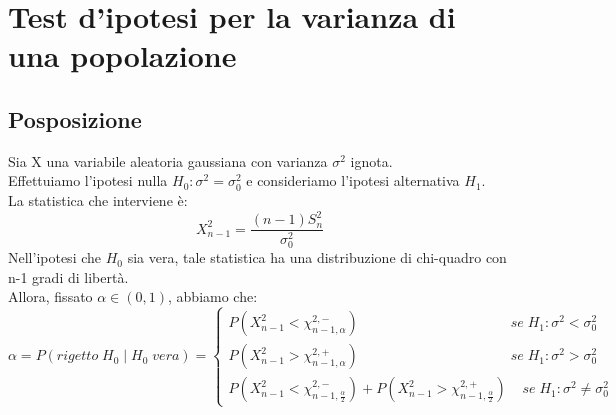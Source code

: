\documentclass{article}
\begin{document}
\section*{Test d'ipotesi per la varianza di una popolazione}
\subsection*{Posposizione}
Sia X una variabile aleatoria gaussiana con varianza $\sigma^{2}$ ignota.\\
Effettuiamo l'ipotesi nulla $H_{0}: \sigma^{2} = \sigma^{2}_{0}$ e consideriamo l'ipotesi alternativa $H_{1}$.\\
La statistica che interviene è:
\[ X_{n-1}^{2} = \frac{(n-1)S_{n}^{2}}{\sigma_{0}^{2}} \]
Nell'ipotesi che $H_{0}$ sia vera, tale statistica ha una distribuzione di chi-quadro con n-1 gradi di libertà.\\
Allora, fissato $\alpha \in (0,1)$, abbiamo che:
\[ \alpha = P(rigetto \;  H_{0} \; | \; H_{0} \; vera) =
\begin{cases}
P(X_{n-1}^{2} < \chi_{n-1,\alpha}^{2,-}) \; \; \; \; \; \; \; \; \; \; \; \; \; \; \; \; \; \; \; \; \; \; \; \; \; \; \; \; \; \; \; \; \; \; \; \; \; \; \; se \; H_{1}: \sigma^{2} < \sigma^{2}_{0}\\
P(X_{n-1}^{2} > \chi_{n-1,\alpha}^{2,+}) \; \; \; \; \; \; \; \; \; \; \; \; \; \; \; \; \; \; \; \; \; \; \; \; \; \; \; \; \; \; \; \; \; \; \; \; \; \; \; se \; H_{1}: \sigma^{2} > \sigma^{2}_{0}\\
P(X_{n-1}^{2} < \chi_{n-1,\frac{\alpha}{2}}^{2,-}) + P(X_{n-1}^{2} > \chi_{n-1,\frac{\alpha}{2}}^{2,+}) \; \; \; \; se \; H_{1}: \sigma^{2} \neq \sigma^{2}_{0}
\end{cases}
\]
\end{document}
